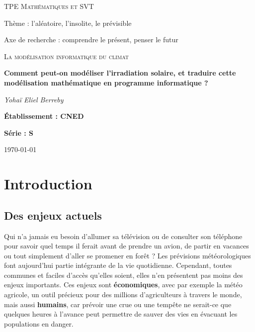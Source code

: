 \documentclass[12pt]{article}
\begin{document}

\begin{titlepage}
	\centering
	
	{\scshape\large TPE Mathématiques et SVT\par}
	\vspace{0.2cm}	
	{ \Large Thème : l'aléatoire, l'insolite, le prévisible\par }
	{ \large Axe de recherche : comprendre le présent, penser le futur\par }
	\vspace{1.5cm}

	{\scshape\LARGE La modélisation informatique du climat \par}
	\vspace{1cm}
	{\huge\bfseries Comment peut-on modéliser l'irradiation solaire, et traduire cette modélisation mathématique en programme informatique ?\par}

	\vspace{1cm}
	{\Large\itshape Yohaï Eliel Berreby\par}
	
	\vfill
	
	
	{\Large\bfseries Établissement : CNED\par}
	\vspace{0.2cm}
	{\Large \bfseries Série : S }

	\vfill

	{\large \today\par}
\end{titlepage}


\clearpage
\tableofcontents{}
\clearpage


\section{Introduction} 

\subsection{Des enjeux actuels}

Qui n'a jamais eu besoin d'allumer sa télévision ou de consulter son téléphone pour savoir quel temps il ferait avant de prendre un avion, de partir en vacances ou tout simplement d'aller se promener en forêt ?
Les prévisions météorologiques font aujourd'hui partie intégrante de la vie quotidienne.
Cependant, toutes communes et faciles d'accès qu'elles soient, elles n'en présentent pas moins des enjeux importants.
Ces enjeux sont \textbf{économiques}, avec par exemple la météo agricole, un outil précieux pour des millions d'agriculteurs à travers le monde, mais aussi \textbf{humains}, car prévoir une crue ou une tempête ne serait-ce que quelques heures à l'avance peut permettre de sauver des vies en évacuant les populations en danger.
\end{document}

